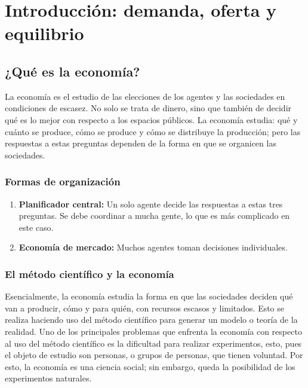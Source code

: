 \documentclass{report}
\begin{document}
\chapter{Introducción: demanda, oferta y equilibrio}

\thispagestyle{fancy}

\section{¿Qué es la economía?}

La economía es el estudio de las elecciones de los agentes y las sociedades en condiciones de escasez. No solo se trata de dinero, sino que también de decidir qué es lo mejor con respecto a los espacios públicos. La economía estudia: qué y cuánto se produce, cómo se produce y cómo se distribuye la producción; pero las respuestas a estas preguntas dependen de la forma en que se organicen las sociedades.

\subsection{Formas de organización}

\begin{enumerate}
\item \textbf{Planificador central:} Un solo agente decide las respuestas a estas tres preguntas. Se debe coordinar a mucha gente, lo que es más complicado en este caso.
\item \textbf{Economía de mercado:} Muchos agentes toman decisiones individuales.
\end{enumerate}

\subsection{El método científico y la economía}

Esencialmente, la economía estudia la forma en que las sociedades deciden qué van a producir, cómo y para quién, con recursos escasos y limitados. Esto se realiza haciendo uso del método científico para generar un modelo o teoría de la realidad. Uno de los principales problemas que enfrenta la economía con respecto al uso del método científico es la dificultad para realizar experimentos, esto, pues el objeto de estudio son personas, o grupos de personas, que tienen voluntad. Por esto, la economía es una ciencia social; sin embargo, queda la posibilidad de los experimentos naturales.
\end{document}
